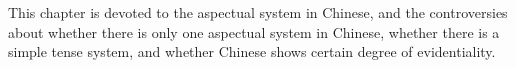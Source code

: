 This chapter is devoted to the aspectual system in Chinese, and the controversies about whether there is 
only one aspectual system in Chinese, whether there is a simple tense system, and whether Chinese shows 
certain degree of evidentiality.